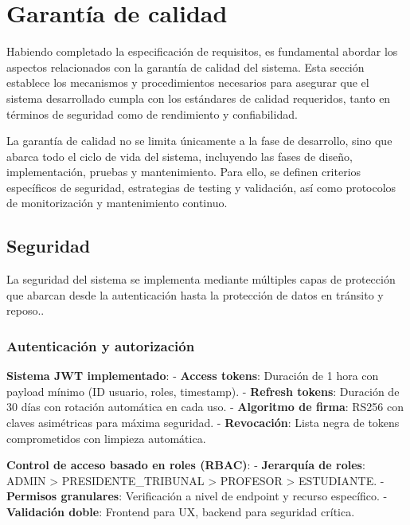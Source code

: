 \documentclass[12pt,a4paper,oneside]{report}
\begin{document}
\section{Garantía de calidad}\label{garantuxeda-de-calidad}

Habiendo completado la especificación de requisitos, es fundamental
abordar los aspectos relacionados con la garantía de calidad del
sistema. Esta sección establece los mecanismos y procedimientos
necesarios para asegurar que el sistema desarrollado cumpla con los
estándares de calidad requeridos, tanto en términos de seguridad como de
rendimiento y confiabilidad.

La garantía de calidad no se limita únicamente a la fase de desarrollo,
sino que abarca todo el ciclo de vida del sistema, incluyendo las fases
de diseño, implementación, pruebas y mantenimiento. Para ello, se
definen criterios específicos de seguridad, estrategias de testing y
validación, así como protocolos de monitorización y mantenimiento
continuo.

\subsection{Seguridad}\label{seguridad-1}

La seguridad del sistema se implementa mediante múltiples capas de
protección que abarcan desde la autenticación hasta la protección de
datos en tránsito y reposo..

\subsubsection{Autenticación y
autorización}\label{autenticaciuxf3n-y-autorizaciuxf3n}

\textbf{Sistema JWT implementado}: - \textbf{Access tokens}: Duración de
1 hora con payload mínimo (ID usuario, roles, timestamp). -
\textbf{Refresh tokens}: Duración de 30 días con rotación automática en
cada uso. - \textbf{Algoritmo de firma}: RS256 con claves asimétricas
para máxima seguridad. - \textbf{Revocación}: Lista negra de tokens
comprometidos con limpieza automática.

\textbf{Control de acceso basado en roles (RBAC)}: - \textbf{Jerarquía
de roles}: ADMIN \textgreater{} PRESIDENTE\_TRIBUNAL \textgreater{}
PROFESOR \textgreater{} ESTUDIANTE. - \textbf{Permisos granulares}:
Verificación a nivel de endpoint y recurso específico. -
\textbf{Validación doble}: Frontend para UX, backend para seguridad
crítica.
\end{document}
